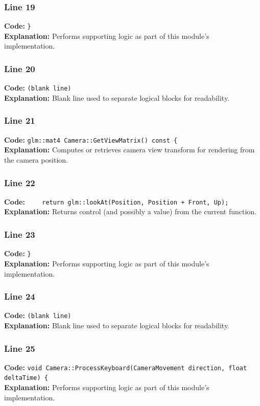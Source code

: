 \documentclass[11pt,a4paper]{article}
\begin{document}
\subsubsection*{Line 19}
\textbf{Code:} \verb|}|\\
\textbf{Explanation:} Performs supporting logic as part of this module's implementation.

\subsubsection*{Line 20}
\textbf{Code:} \texttt{(blank line)}\\
\textbf{Explanation:} Blank line used to separate logical blocks for readability.

\subsubsection*{Line 21}
\textbf{Code:} \verb|glm::mat4 Camera::GetViewMatrix() const {|\\
\textbf{Explanation:} Computes or retrieves camera view transform for rendering from the camera position.

\subsubsection*{Line 22}
\textbf{Code:} \verb|    return glm::lookAt(Position, Position + Front, Up);|\\
\textbf{Explanation:} Returns control (and possibly a value) from the current function.

\subsubsection*{Line 23}
\textbf{Code:} \verb|}|\\
\textbf{Explanation:} Performs supporting logic as part of this module's implementation.

\subsubsection*{Line 24}
\textbf{Code:} \texttt{(blank line)}\\
\textbf{Explanation:} Blank line used to separate logical blocks for readability.

\subsubsection*{Line 25}
\textbf{Code:} \verb|void Camera::ProcessKeyboard(CameraMovement direction, float deltaTime) {|\\
\textbf{Explanation:} Performs supporting logic as part of this module's implementation.
\end{document}
